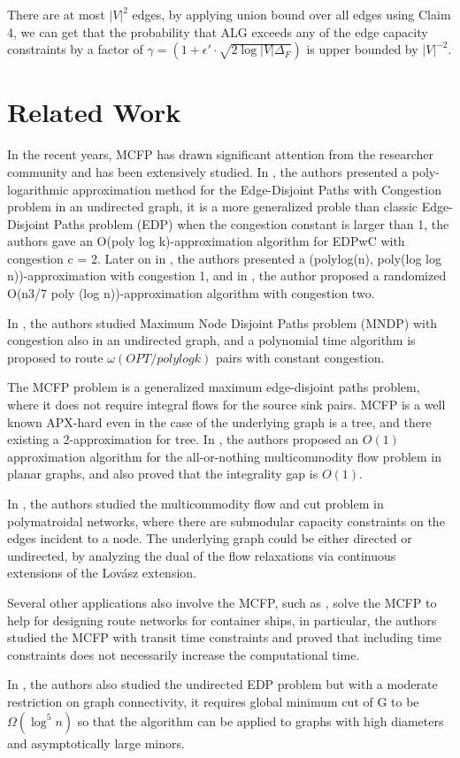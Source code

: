 \documentclass[onecolumn,11pt,journal, compsoc]{IEEEtran}
\begin{document}
There are at most $|V|^2$ edges, by applying union bound over all edges using Claim 4, we can get that the probability that ALG exceeds any of the edge capacity constraints by a factor of $\gamma = (1+\epsilon' \cdot \sqrt{2\log|V|\Delta_F})$ is upper bounded by $|V|^{-2}$.



\section{Related Work}

In the recent years, MCFP has drawn significant attention from the researcher community and has been extensively studied. In \cite{1}, the authors presented a poly-logarithmic approximation method for the Edge-Disjoint Paths with Congestion problem in an undirected graph, it is a more generalized proble than classic Edge-Disjoint Paths problem (EDP) when the congestion constant is larger than 1, the authors gave an O(poly log k)-approximation algorithm for EDPwC with congestion c = 2.  Later on in \cite{6}, the authors presented a (polylog(n), poly(log log n))-approximation with congestion 1, and in \cite{7}, the author proposed a randomized O(n3/7 poly (log n))-approximation algorithm with congestion two. 

In \cite{2}, the authors studied Maximum Node Disjoint Paths problem (MNDP) with congestion also in an undirected graph, and a polynomial time algorithm is proposed to route $\omega(OPT/poly log k)$ pairs with constant congestion. 

The MCFP problem is a generalized maximum edge-disjoint paths problem, where it does not require integral flows for the source sink pairs. MCFP is a well known APX-hard even in the case of the underlying graph is a tree, and there existing a 2-approximation for tree. In \cite{3}, the authors proposed an $O(1)$ approximation algorithm for the all-or-nothing multicommodity flow problem in planar graphs, and also proved that the integrality gap is $O(1)$.


In \cite{4}, the authors studied the multicommodity flow and cut problem in polymatroidal networks, where there are submodular capacity constraints on the edges incident to a node. The underlying graph could be either directed or undirected, by analyzing the dual of the flow relaxations via continuous extensions of the Lovász extension. 

Several other applications also involve the MCFP, such as \cite{5}, solve the MCFP to help for designing route networks for container ships, in particular, the authors studied the MCFP with transit time constraints and proved that including time constraints does not necessarily increase the computational time. 


In \cite{8}, the authors also studied the undirected EDP problem but with a moderate restriction on graph connectivity, it requires global minimum cut of G to be $\Omega(\log^5n)$ so that the algorithm can be applied to graphs with high diameters and asymptotically large minors.
\end{document}
